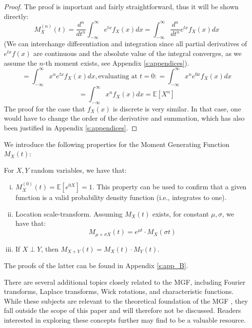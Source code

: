\begin{proof}
    The proof is important and fairly straightforward, thus it will be shown directly:
    \[M_X^{(n)}(t) = \frac{d^n}{dt^n} \int_{-\infty}^{\infty} e^{tx} f_X(x) dx = \int_{-\infty}^{\infty} \frac{d^n}{dt^n} e^{tx} f_X(x) dx\] (We can interchange differentiation and integration since all partial derivatives of \(e^{tx} f(x)\) are continuous and the absolute value of the integral converges, as we assume the \(n\)-th moment exists, see Appendix \ref{s:appendices}).
    \[ = \int_{-\infty}^{\infty} x^n e^{tx} f_X(x) dx, \text{evaluating at } t = 0: = \int_{-\infty}^{\infty} x^n e^{0x} f_X(x) dx\]
    \[ = \int_{-\infty}^{\infty} x^n f_X(x) dx = \mathbb{E}[X^n]\]
    The proof for the case that \(f_X(x)\) is discrete is very similar. In that case, one would have to change the order of the derivative and summation, which has also been justified in Appendix \ref{s:appendices}.
\end{proof}


We introduce the following properties for the Moment Generating Function \(M_X(t)\):
\begin{proposition}\label{p: moments}
    For \(X, Y\) random variables, we have that:
    \begin{enumerate}[(i)]
        \item \(M_X^{(0)}(t) = \mathbb{E}[e^{0X}] = 1\). This property can be used to confirm that a given function is a valid probability density function (i.e., integrates to one).
        \item Location scale-transform. Assuming \(M_X(t)\) exists, for constant \(\mu, \sigma\), we have that: 
        \[M_{\mu + \sigma X}(t) = e^{\mu t} \cdot M_X(\sigma t)\]
        \item If \(X \perp Y\), then \(M_{X+Y}(t) = M_X(t)\cdot M_Y(t)\).
    \end{enumerate}
\end{proposition}

The proofs of the latter can be found in Appendix \ref{s:app_B}.

There are several additional topics closely related to the MGF, including Fourier transforms, Laplace transforms, Wick rotations, and characteristic functions. While these subjects are relevant to the theoretical foundation of the MGF , they fall outside the scope of this paper and will therefore not be discussed. Readers interested in exploring these concepts further may find \cite{kolmogorov1999} to be a valuable resource.

